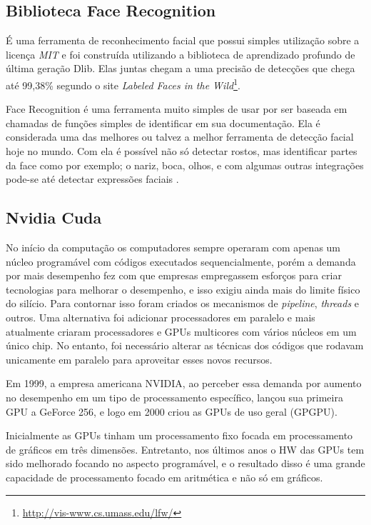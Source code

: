 \subsection{Biblioteca Face Recognition}
É uma ferramenta de reconhecimento facial que possui simples utilização sobre a licença \textit{MIT} e foi construída utilizando a biblioteca de aprendizado profundo de última geração Dlib.  Elas juntas chegam a uma precisão de detecções que chega até 99,38\% segundo o site \textit{Labeled Faces in the Wild}\footnote{\url{http://vis-www.cs.umass.edu/lfw/}}. 

Face Recognition é uma ferramenta muito simples de usar por ser baseada em chamadas de funções simples de identificar em sua documentação. Ela é considerada uma das melhores ou talvez a melhor ferramenta de detecção facial hoje no mundo. 
Com ela é possível não só detectar rostos, mas identificar partes da face como por exemplo; o nariz, boca, olhos, e com algumas outras integrações pode-se até detectar expressões faciais \cite{vinteoito}.

\subsection{Nvidia Cuda}
No início da computação os computadores sempre operaram com apenas um núcleo programável com códigos executados sequencialmente, porém a demanda por mais desempenho fez com que empresas empregassem esforços para criar tecnologias para melhorar o desempenho, e isso exigiu ainda mais do limite físico do silício. Para contornar isso foram criados os mecanismos de \textit{pipeline}, \textit{threads} e outros. Uma alternativa foi adicionar processadores em paralelo e mais atualmente criaram processadores e GPUs multicores com vários núcleos em um único chip. No entanto, foi necessário alterar as técnicas dos códigos que rodavam unicamente em paralelo para aproveitar esses novos recursos.

Em 1999, a empresa americana NVIDIA, ao perceber essa demanda por aumento no desempenho em um tipo de processamento específico, lançou sua primeira GPU a GeForce 256, e logo em 2000 criou as GPUs de uso geral (GPGPU).

Inicialmente as GPUs tinham um processamento fixo focada em processamento de gráficos em três dimensões. Entretanto, nos últimos anos o HW das GPUs tem sido melhorado focando no aspecto programável, e o resultado disso é uma grande capacidade de processamento focado em aritmética e não só em gráficos.

